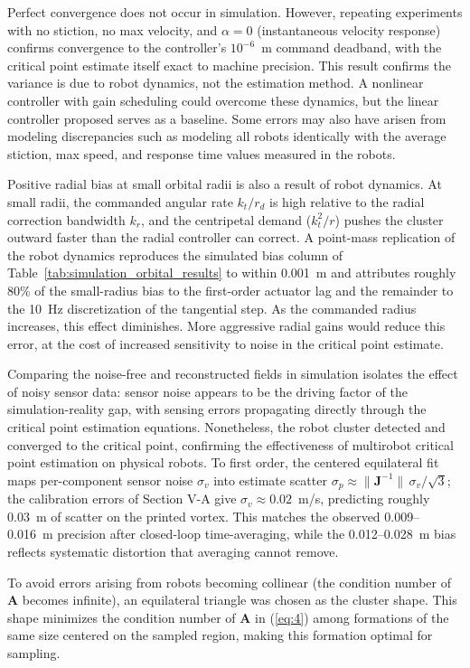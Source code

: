 \documentclass[lettersize,journal]{IEEEtran}
\begin{document}
Perfect convergence does not occur in simulation. However, repeating experiments with no stiction, no max velocity, and $\alpha = 0$ (instantaneous velocity response) confirms convergence to the controller's $10^{-6}$~m command deadband, with the critical point estimate itself exact to machine precision. This result confirms the variance is due to robot dynamics, not the estimation method. A nonlinear controller with gain scheduling could overcome these dynamics, but the linear controller proposed serves as a baseline. Some errors may also have arisen from modeling discrepancies such as modeling all robots identically with the average stiction, max speed, and response time values measured in the robots.

Positive radial bias at small orbital radii is also a result of robot dynamics. At small radii, the commanded angular rate $k_t / r_d$ is high relative to the radial correction bandwidth $k_r$, and the centripetal demand ($k_t^2 / r$) pushes the cluster outward faster than the radial controller can correct. A point-mass replication of the robot dynamics reproduces the simulated bias column of Table~\ref{tab:simulation_orbital_results} to within 0.001~m and attributes roughly 80\% of the small-radius bias to the first-order actuator lag and the remainder to the 10~Hz discretization of the tangential step. As the commanded radius increases, this effect diminishes. More aggressive radial gains would reduce this error, at the cost of increased sensitivity to noise in the critical point estimate.

Comparing the noise-free and reconstructed fields in simulation isolates the effect of noisy sensor data: sensor noise appears to be the driving factor of the simulation-reality gap, with sensing errors propagating directly through the critical point estimation equations. Nonetheless, the robot cluster detected and converged to the critical point, confirming the effectiveness of multirobot critical point estimation on physical robots. To first order, the centered equilateral fit maps per-component sensor noise $\sigma_v$ into estimate scatter $\sigma_p \approx \|\mathbf{J}^{-1}\|\,\sigma_v/\sqrt{3}$; the calibration errors of Section V-A give $\sigma_v \approx 0.02$~m/s, predicting roughly 0.03~m of scatter on the printed vortex. This matches the observed 0.009--0.016~m precision after closed-loop time-averaging, while the 0.012--0.028~m bias reflects systematic distortion that averaging cannot remove.

To avoid errors arising from robots becoming collinear (the condition number of $\mathbf{A}$ becomes infinite), an equilateral triangle was chosen as the cluster shape. This shape minimizes the condition number of $\mathbf{A}$ in (\ref{eq:4}) among formations of the same size centered on the sampled region, making this formation optimal for sampling.
\end{document}
